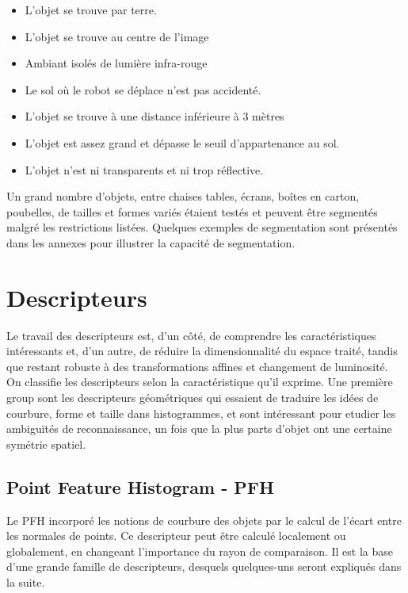 \begin{itemize}

\item L'objet se trouve par terre.

\item L'objet se trouve au centre de l'image
\item Ambiant isolés de lumière infra-rouge 

\item Le sol où le robot se déplace n'est pas accidenté.


\item L'objet se trouve à une distance inférieure à 3 mètres 


\item L'objet est assez grand et dépasse le seuil d'appartenance au
  sol.

\item L'objet n'est ni transparents et ni trop réflective.

\end{itemize}

Un grand nombre d'objets, entre chaises tables, écrans, boîtes en
carton, poubelles, de tailles et formes variés étaient testés et
peuvent être segmentés malgré les restrictions listées. Quelques
exemples de segmentation sont présentés dans les annexes pour illustrer
la capacité de segmentation.

\section{Descripteurs}

Le travail des descripteurs est, d'un côté, de comprendre les
caractéristiques intéressants et, d'un autre, de réduire la
dimensionnalité du espace traité, tandis que restant robuste à des
transformations affines et changement de luminosité. On classifie les
descripteurs selon la caractéristique qu'il exprime. Une première
group sont les descripteurs géométriques qui essaient de traduire les
idées de courbure, forme et taille dans histogrammes, et sont intéressant
pour etudier les ambiguïtés de reconnaissance, un fois que la plus parts 
d'objet ont une certaine symétrie spatiel.

\subsection{Point Feature Histogram - PFH}

Le PFH incorporé les notions de courbure des objets par le calcul de
l'écart entre les normales de points. Ce descripteur peut être calculé
localement ou globalement, en changeant l'importance du rayon de
comparaison. Il est la base d'une grande famille de descripteurs, desquels
quelques-uns seront expliqués dans la suite.

